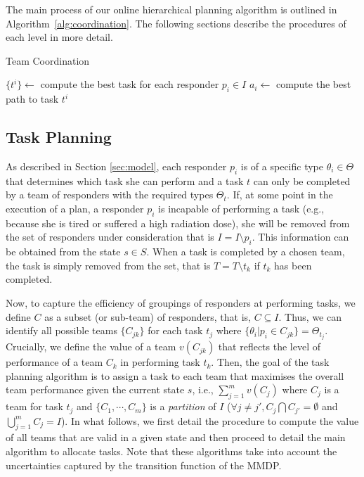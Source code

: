 The main process of our online hierarchical planning algorithm is
outlined in Algorithm~\ref{alg:coordination}. The following
sections describe the procedures of each level in more detail.

\begin{algorithm}[t]
  \caption{Team Coordination}\small
  \label{alg:coordination}
  \Indm
  \Indp\BlankLine
  $\{ t^i \} \gets$ compute the best task for each responder $p_i\in I$ \;
   {
    $a_i \gets$ compute the best path to task $t^i$ \;
  }
  \vspace{-1mm}
\end{algorithm}


\subsection{Task Planning}
\label{sec:taskplanning}
\noindent As described in Section \ref{sec:model}, each responder
$p_i$ is of a specific type $\theta_i \in \Theta$ that determines which task
she can perform and  a task $t$ can only be completed by a team of
responders with the required types $\Theta_t$. If, at some point in
the execution of a plan, a responder $p_i$ is incapable of
performing a task (e.g., because she is tired or suffered a high
radiation dose), she will be removed from the set of responders
under consideration that is $I = I \setminus p_i$. This
information can be obtained from the state $s \in S$. When a task
is completed by a chosen team, the task is simply removed from the
set, that is $T = T\setminus t_k$ if $t_k$ has been completed.

Now, to capture the efficiency of groupings of responders at
performing tasks, we define  $C$ as a subset (or sub-team) of
responders, that is, $C \subseteq I$. Thus, we can identify all
possible teams $\{ C_{jk} \}$ for each task $t_j$ where $\{\theta_i
| p_i \in C_{jk}\} = \Theta_{t_j}$. Crucially, we define the value
of a team $v(C_{jk})$ that reflects the level of performance of a
team $C_k$ in performing task $t_k$.  Then, the goal of the task
planning algorithm is to assign a task to each team that maximises
the overall team performance given the current state $s$, i.e.,
$\sum_{j=1}^m v(C_j)$ where $C_j$ is a team for task $t_j$ and $\{
C_1, \cdots, C_m \}$ is a {\em partition} of $I$ ($\forall j\neq
j', C_j \bigcap C_{j'} = \emptyset$ and $\bigcup_{j=1}^m C_j=I$).
In what follows, we first detail the procedure to compute the value
of all teams that are valid in a given state and then proceed to
detail the main algorithm to allocate tasks. Note that these
algorithms take into account the uncertainties captured by the
transition function of the MMDP.


